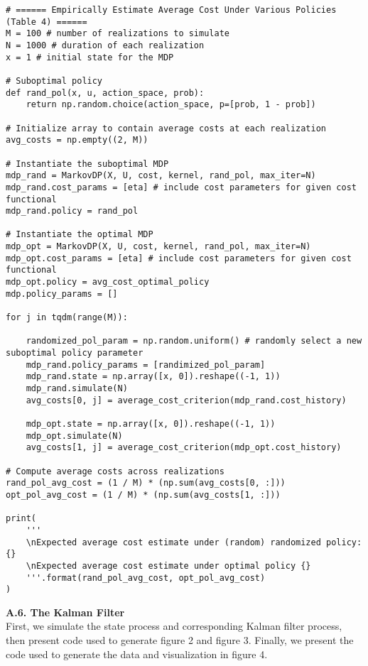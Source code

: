 \documentclass[10pt]{article}
\newcommand{\1}[1]{\mathbbm{1}_{#1}}
\begin{document}
    \begin{verbatim}
# ====== Empirically Estimate Average Cost Under Various Policies (Table 4) ======
M = 100 # number of realizations to simulate
N = 1000 # duration of each realization
x = 1 # initial state for the MDP

# Suboptimal policy
def rand_pol(x, u, action_space, prob):
    return np.random.choice(action_space, p=[prob, 1 - prob])

# Initialize array to contain average costs at each realization
avg_costs = np.empty((2, M))

# Instantiate the suboptimal MDP
mdp_rand = MarkovDP(X, U, cost, kernel, rand_pol, max_iter=N)
mdp_rand.cost_params = [eta] # include cost parameters for given cost functional
mdp_rand.policy = rand_pol

# Instantiate the optimal MDP
mdp_opt = MarkovDP(X, U, cost, kernel, rand_pol, max_iter=N)
mdp_opt.cost_params = [eta] # include cost parameters for given cost functional
mdp_opt.policy = avg_cost_optimal_policy
mdp.policy_params = []

for j in tqdm(range(M)):

    randomized_pol_param = np.random.uniform() # randomly select a new suboptimal policy parameter
    mdp_rand.policy_params = [randimized_pol_param] 
    mdp_rand.state = np.array([x, 0]).reshape((-1, 1))
    mdp_rand.simulate(N)
    avg_costs[0, j] = average_cost_criterion(mdp_rand.cost_history)

    mdp_opt.state = np.array([x, 0]).reshape((-1, 1))
    mdp_opt.simulate(N)
    avg_costs[1, j] = average_cost_criterion(mdp_opt.cost_history)

# Compute average costs across realizations 
rand_pol_avg_cost = (1 / M) * (np.sum(avg_costs[0, :]))
opt_pol_avg_cost = (1 / M) * (np.sum(avg_costs[1, :]))

print(
    '''
    \nExpected average cost estimate under (random) randomized policy: {}
    \nExpected average cost estimate under optimal policy {}
    '''.format(rand_pol_avg_cost, opt_pol_avg_cost)
)
    \end{verbatim}
    {\bf A.6. The Kalman Filter}\\[5pt]
    First, we simulate the state process and corresponding Kalman filter process, then present code used to generate
    figure 2 and figure 3. Finally, we present the code used to generate the data and visualization in figure 4.
\end{document}
